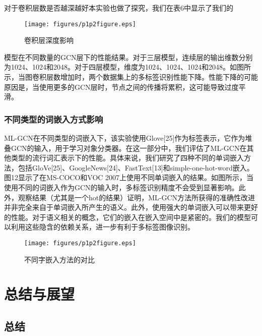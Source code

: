 对于卷积层数是否越深越好本实验也做了探究，我们在表6中显示了我们的
\begin{figure}[htbp!]
	\centering
	\texttt{[image: figures/p1p2figure.eps]}
	\caption{卷积层深度影响}\label{fig:simuP1P2Result}
	\vspace{-1em}
\end{figure}

模型在不同数量的GCN层下的性能结果。对于三层模型，连续层的输出维数分别为1024、1024和2048。对于四层模型，维度为1024、1024、1024和2048。如图所示，当图卷积层数增加时，两个数据集上的多标签识别性能下降。性能下降的可能原因是，当使用更多的GCN层时，节点之间的传播将累积，这可能导致过度平滑。

\subsection{不同类型的词嵌入方式影响}

ML-GCN在不同类型的词嵌入下，该实验使用Glove[25]作为标签表示，它作为堆叠GCN的输入，用于学习对象分类器。在这一部分中，我们评估了ML-GCN在其他类型的流行词汇表示下的性能。具体来说，我们研究了四种不同的单词嵌入方法，包括GloVe[25]、GoogleNews[24]、FastText[13]和simple-one-hot-word嵌入。图12显示了在MS-COCO和VOC 2007上使用不同单词嵌入的结果。如图所示，当使用不同的词嵌入作为GCN的输入时，多标签识别精度不会受到显著影响。此外，观察结果（尤其是一个hot的结果）证明，ML-GCN方法所获得的准确性改进并非完全来自于单词嵌入所产生的语义。此外，使用强大的单词嵌入可以带来更好的性能。对于语义相关的概念，它们的嵌入在嵌入空间中是紧密的。我们的模型可以利用这些隐含的依赖关系，进一步有利于多标签图像识别。

\begin{figure}[htbp!]
	\centering
	\texttt{[image: figures/p1p2figure.eps]}
	\caption{不同字嵌入方法的对比}\label{fig:simuP1P2Result}
	\vspace{-1em}
\end{figure}

\chapter{总结与展望}

\section{总结}

